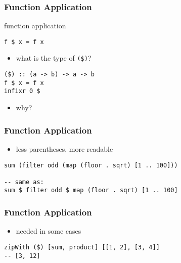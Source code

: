 \documentclass[dvipsnames]{beamer}
\theoremstyle{plain}
\begin{document}
\begin{frame}[fragile]
  \frametitle{Function Application}

  \begin{block}{function application}
    \begin{lstlisting}
f $ x = f x
    \end{lstlisting}
  \end{block}

  \pause
  \begin{itemize}
    \item what is the type of \lstinline|($)|?
  \end{itemize}

  \begin{exampleblock}{}
    \begin{lstlisting}
($) :: (a -> b) -> a -> b
f $ x = f x
infixr 0 $
    \end{lstlisting}
  \end{exampleblock}

  \pause
  \begin{itemize}
    \item why?
  \end{itemize}
\end{frame}

\begin{frame}[fragile]
  \frametitle{Function Application}

  \begin{itemize}
    \item less parentheses, more readable
  \end{itemize}

  \begin{exampleblock}{}
    \begin{lstlisting}
sum (filter odd (map (floor . sqrt) [1 .. 100]))

-- same as:
sum $ filter odd $ map (floor . sqrt) [1 .. 100]
    \end{lstlisting}
  \end{exampleblock}
\end{frame}

\begin{frame}[fragile]
  \frametitle{Function Application}

  \begin{itemize}
    \item needed in some cases
  \end{itemize}

  \begin{exampleblock}{}
    \begin{lstlisting}
zipWith ($) [sum, product] [[1, 2], [3, 4]]
-- [3, 12]
    \end{lstlisting}
  \end{exampleblock}
\end{frame}
\end{document}
